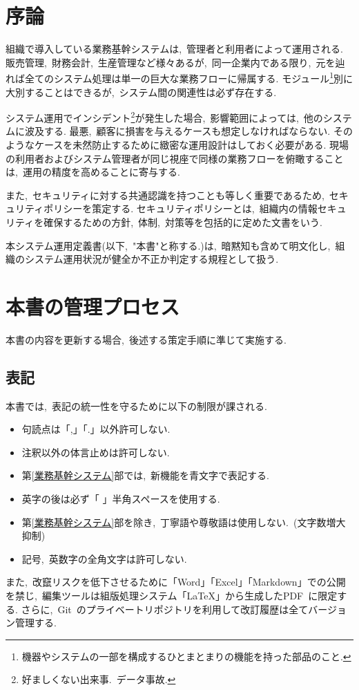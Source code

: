 
\section{序論}
組織で導入している業務基幹システムは,~管理者と利用者によって運用される.
販売管理,~財務会計,~生産管理など様々あるが,~同一企業内である限り,~元を辿れば全てのシステム処理は単一の巨大な業務フローに帰属する.
モジュール\footnote{機器やシステムの一部を構成するひとまとまりの機能を持った部品のこと.}別に大別することはできるが,~システム間の関連性は必ず存在する.

システム運用でインシデント\footnote{好ましくない出来事.~データ事故.}が発生した場合,~影響範囲によっては,~他のシステムに波及する.
最悪,~顧客に損害を与えるケースも想定しなければならない.
そのようなケースを未然防止するために緻密な運用設計はしておく必要がある.
現場の利用者およびシステム管理者が同じ視座で同様の業務フローを俯瞰することは,~運用の精度を高めることに寄与する.

また,~セキュリティに対する共通認識を持つことも等しく重要であるため,~セキュリティポリシーを策定する.
セキュリティポリシーとは,~組織内の情報セキュリティを確保するための方針,~体制,~対策等を包括的に定めた文書をいう.

本システム運用定義書(以下,~"本書"と称する.)は,~暗黙知も含めて明文化し,~組織のシステム運用状況が健全か不正か判定する規程として扱う.

\section{本書の管理プロセス}
本書の内容を更新する場合,~後述する策定手順に準じて実施する.

\subsection{表記}
本書では,~表記の統一性を守るために以下の制限が課される.
\begin{itemize}
    \item 句読点は「,」「.」以外許可しない.
    \item 注釈以外の体言止めは許可しない.
    \item 第\ref{業務基幹システム}部では,~新機能を青文字で表記する.
    \item 英字の後は必ず「 」半角スペースを使用する.
    \item 第\ref{業務基幹システム}部を除き,~丁寧語や尊敬語は使用しない.~(文字数増大抑制)
    \item 記号,~英数字の全角文字は許可しない.
\end{itemize}
また,~改竄リスクを低下させるために「Word」「Excel」「Markdown」での公開を禁じ,~編集ツールは組版処理システム「\LaTeX」から生成したPDF~に限定する.
さらに,~Git~のプライベートリポジトリを利用して改訂履歴は全てバージョン管理する.

